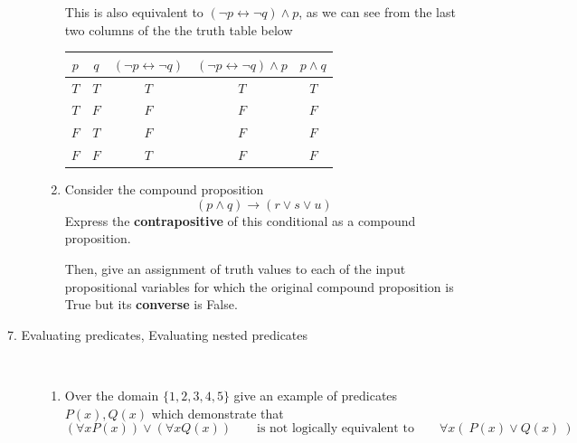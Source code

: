 \documentclass[12pt, oneside]{article}
\newif \ifsolution
\newcommand{\sol}[1]{\medskip\fbox{\begin{minipage}{5.5in}{#1}\end{minipage}}\medskip}
\begin{document}
\begin{description}
\begin{enumerate}
{This is also equivalent to  $(\neg p \leftrightarrow \neg q) \wedge p$, as we can see from
the last two columns of the the truth 
table below

\begin{center}
\begin{tabular}{cc||c|c|c}
$p$ & $q$ & $(\neg p \leftrightarrow \neg q)$ & $(\neg p \leftrightarrow \neg q) \land p$ & $p \land q$ \\
\hline
$T$ & $T$ & $T$ & $T$ & $T$ \\
$T$ & $F$ & $F$ & $F$ & $F$ \\
$F$ & $T$ & $F$ & $F$ & $F$ \\
$F$ & $F$ & $T$ & $F$ & $F$ \\
\end{tabular}
\end{center}
}
\else{}
\fi

\item Consider the compound proposition 
\[
(p \wedge q) \to (r \vee s \vee u)
\]
Express the {\bf contrapositive} of this conditional as a compound proposition.

Then, give an assignment of truth values to each of the input propositional variables
for which the original compound proposition is True but its {\bf converse} is False.

\ifsolution
\sol{
The contrapositive of this conditional 
is 
\[
\neg (r \vee s \vee u) \to \neg (p \land q)
\]
The converse of the original conditional is
\[
(r \vee s \vee u) \to (p \land q)
\]
Consider the assignment of truth values
\[
p = T \qquad q = F \qquad r = T \qquad s = F \qquad u = F
\]
We evaluate the original conditional and its converse with this assignment of truth values:
\begin{align*}
\textrm{Original}: (p \wedge q) \to (r \vee s \vee u) &= (T \wedge F) \to (T \vee F \vee F) = F \to T = T \\
\textrm{Converse}: (r \vee s \vee u) \to (p \wedge q) &= (T \vee F \vee F) \to (T \wedge F) = T \to F = F 
\end{align*}
}
\else{}
\fi
\end{enumerate}


\item[7. Evaluating predicates, Evaluating nested predicates] \qquad \\
\begin{enumerate}\item Over the domain $\{ 1,2,3,4,5\}$ give an example of predicates $P(x), Q(x)$
which demonstrate that 
\[
(\forall x P(x)) \vee (\forall x Q(x))
\qquad \text{is not logically equivalent to} \qquad 
 \forall x  (~ P(x) \vee Q(x) ~)
\]


\end{enumerate}
\end{description}
\end{document}
